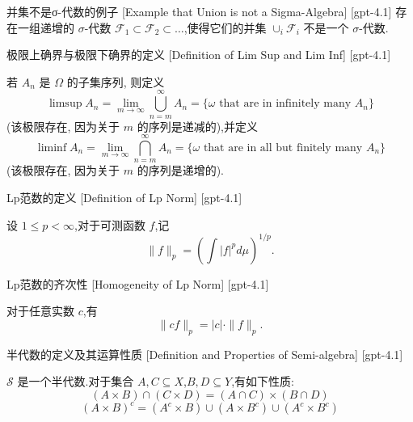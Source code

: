 \documentclass[UTF8]{ctexart}
\begin{document}
    
    
    \begin{xmp}
        {并集不是σ-代数的例子}
        [Example that Union is not a Sigma-Algebra]
        [gpt-4.1]
        存在一组递增的 $\sigma$-代数 ${\mathcal{F}}_{1} \subset {\mathcal{F}}_{2} \subset \ldots$,使得它们的并集 $\cup_{i} {\mathcal{F}}_{i}$ 不是一个 $\sigma$-代数.
    \end{xmp}
    
    
    
    \begin{dfn}
        {极限上确界与极限下确界的定义}
        [Definition of Lim Sup and Lim Inf]
        [gpt-4.1]
        
若 $A_{n}$ 是 $\Omega$ 的子集序列, 则定义
\[
\limsup A_{n} = \lim_{m \to \infty} \bigcup_{n = m}^{\infty} A_{n} = \{\omega \text{ that are in infinitely many } A_{n}\}
\]
(该极限存在, 因为关于 $m$ 的序列是递减的),并定义
\[
\liminf A_{n} = \lim_{m \to \infty} \bigcap_{n = m}^{\infty} A_{n} = \{\omega \text{ that are in all but finitely many } A_{n}\}
\]
(该极限存在, 因为关于 $m$ 的序列是递增的).

    \end{dfn}
    
    
    
    \begin{dfn}
        {Lp范数的定义}
        [Definition of Lp Norm]
        [gpt-4.1]
        
设 $1 \leq p < \infty$,对于可测函数 $f$,记
\[
\| f \|_{p} = \left( \int |f|^{p} d\mu \right)^{1/p}.
\]

    \end{dfn}
    
    
    
    \begin{ppt}
        {Lp范数的齐次性}
        [Homogeneity of Lp Norm]
        [gpt-4.1]
        
对于任意实数 $c$,有
\[
\| c f \|_{p} = |c| \cdot \| f \|_{p}.
\]

    \end{ppt}
    
    
    
    \begin{dfn}
        {半代数的定义及其运算性质}
        [Definition and Properties of Semi-algebra]
        [gpt-4.1]
        
$\mathcal{S}$ 是一个半代数.对于集合 $A, C \subseteq X$,$B, D \subseteq Y$,有如下性质:
\[
(A \times B) \cap (C \times D) = (A \cap C) \times (B \cap D)
\]
\[
(A \times B)^{c} = (A^{c} \times B) \cup (A \times B^{c}) \cup (A^{c} \times B^{c})
\]

    \end{dfn}
    
\end{document}

